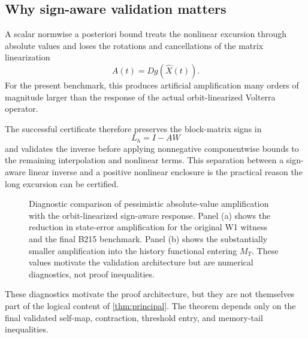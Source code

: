 \subsection{Why sign-aware validation matters}

A scalar normwise a posteriori bound treats the nonlinear excursion through absolute values and loses the rotations and cancellations of the matrix linearization
\[
  A(t)=Dg(\widehat X(t)).
\]
For the present benchmark, this produces artificial amplification many orders of magnitude larger than the response of the actual orbit-linearized Volterra operator.

The successful certificate therefore preserves the block-matrix signs in
\[
  L_h=I-AW
\]
and validates the inverse before applying nonnegative componentwise bounds to the remaining interpolation and nonlinear terms. This separation between a sign-aware linear inverse and a positive nonlinear enclosure is the practical reason the long excursion can be certified.

\begin{figure}[t]
  \centering
  \resizebox{\textwidth}{!}{}
  \caption{Diagnostic comparison of pessimistic absolute-value amplification with the orbit-linearized sign-aware response.  Panel (a) shows the reduction in state-error amplification for the original W1 witness and the final B215 benchmark.  Panel (b) shows the substantially smaller amplification into the history functional entering \(M_T\).  These values motivate the validation architecture but are numerical diagnostics, not proof inequalities.}
  \label{fig:amplification}
\end{figure}

These diagnostics motivate the proof architecture, but they are not themselves part of the logical content of \cref{thm:principal}. The theorem depends only on the final validated self-map, contraction, threshold entry, and memory-tail inequalities.
